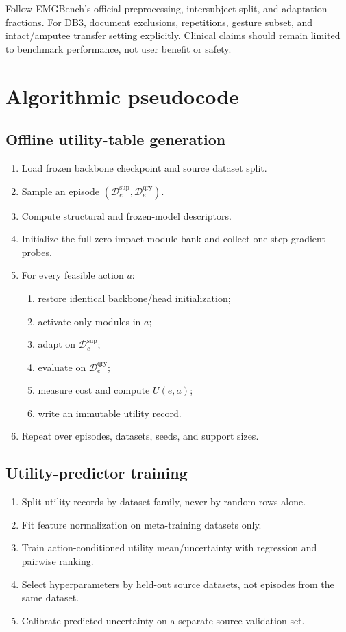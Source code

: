 \documentclass[10pt]{article}
\newcommand{\D}{\mathcal{D}}
\begin{document}
Follow EMGBench's official preprocessing, intersubject split, and adaptation fractions. For DB3, document exclusions, repetitions, gesture subset, and intact/amputee transfer setting explicitly. Clinical claims should remain limited to benchmark performance, not user benefit or safety.

\section{Algorithmic pseudocode}

\subsection{Offline utility-table generation}

\begin{enumerate}[leftmargin=*, itemsep=1pt]
    \item Load frozen backbone checkpoint and source dataset split.
    \item Sample an episode $(\D_e^{\mathrm{sup}},\D_e^{\mathrm{qry}})$.
    \item Compute structural and frozen-model descriptors.
    \item Initialize the full zero-impact module bank and collect one-step gradient probes.
    \item For every feasible action $a$:
    \begin{enumerate}[itemsep=0pt]
        \item restore identical backbone/head initialization;
        \item activate only modules in $a$;
        \item adapt on $\D_e^{\mathrm{sup}}$;
        \item evaluate on $\D_e^{\mathrm{qry}}$;
        \item measure cost and compute $U(e,a)$;
        \item write an immutable utility record.
    \end{enumerate}
    \item Repeat over episodes, datasets, seeds, and support sizes.
\end{enumerate}

\subsection{Utility-predictor training}

\begin{enumerate}[leftmargin=*, itemsep=1pt]
    \item Split utility records by dataset family, never by random rows alone.
    \item Fit feature normalization on meta-training datasets only.
    \item Train action-conditioned utility mean/uncertainty with regression and pairwise ranking.
    \item Select hyperparameters by held-out source datasets, not episodes from the same dataset.
    \item Calibrate predicted uncertainty on a separate source validation set.
\end{enumerate}
\end{document}
